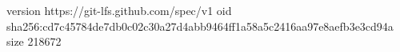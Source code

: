 version https://git-lfs.github.com/spec/v1
oid sha256:cd7c45784de7db0c02c30a27d4abb9464ff1a58a5c2416aa97e8aefb3e3cd94a
size 218672
